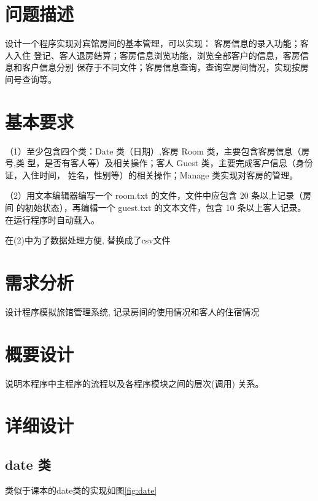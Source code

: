 \documentclass[UTF8]{ctexart}
\begin{document}

\newpage
\tableofcontents

\section{问题描述}
  设计一个程序实现对宾馆房间的基本管理，可以实现：
  客房信息的录入功能；客人入住
  登记、客人退房结算；客房信息浏览功能，浏览全部客户的信息，客房信息和客户信息分别
  保存于不同文件；客房信息查询，查询空房间情况，实现按房间号查询等。

\section{基本要求}
  （1）至少包含四个类：Date 类（日期）,客房 Room 类，主要包含客房信息（房号,类
  型，是否有客人等）及相关操作；客人 Guest 类，主要完成客户信息（身份证，入住时间，
  姓名，性别等）的相关操作；Manage 类实现对客房的管理。

  （2）用文本编辑器编写一个 room.txt 的文件，文件中应包含 20 条以上记录（房间
  的初始状态），再编辑一个 guest.txt 的文本文件，包含 10 条以上客人记录。在运行程序时自动载入。

  在(2)中为了数据处理方便, 替换成了csv文件
\section{需求分析}
  设计程序模拟旅馆管理系统, 记录房间的使用情况和客人的住宿情况
\section{概要设计}
  说明本程序中主程序的流程以及各程序模块之间的层次(调用) 关系。
\section{详细设计}

  \subsection{date 类}

    类似于课本\cite{textbook}的date类的实现如图\ref{fig:date}
\end{document}
